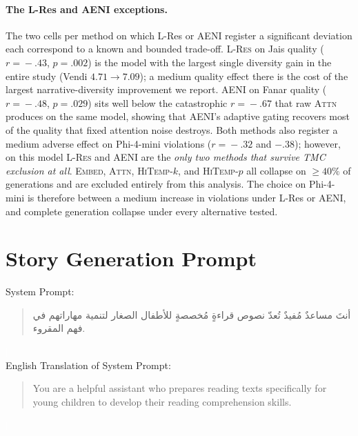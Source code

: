 \documentclass[11pt]{article}
\begin{document}
\paragraph{The L-Res and AENI exceptions.} The two cells per method on which L-Res or AENI register a significant deviation each correspond to a known and bounded trade-off. \textsc{L-Res} on Jais quality ($r\!=\!-.43$, $p\!=\!.002$) is the model with the largest single diversity gain in the entire study (Vendi $4.71 \to 7.09$); a medium quality effect there is the cost of the largest narrative-diversity improvement we report. \textsc{AENI} on Fanar quality ($r\!=\!-.48$, $p\!=\!.029$) sits well below the catastrophic $r\!=\!-.67$ that raw \textsc{Attn} produces on the same model, showing that AENI's adaptive gating recovers most of the quality that fixed attention noise destroys. Both methods also register a medium adverse effect on Phi-4-mini violations ($r\!=\!-.32$ and $-.38$); however, on this model \textsc{L-Res} and \textsc{AENI} are the \emph{only two methods that survive TMC exclusion at all}. \textsc{Embed}, \textsc{Attn}, \textsc{HiTemp-$k$}, and \textsc{HiTemp-$p$} all collapse on $\geq 40\%$ of generations and are excluded entirely from this analysis. The choice on Phi-4-mini is therefore between a medium increase in violations under L-Res or AENI, and complete generation collapse under every alternative tested.

\section{Story Generation Prompt}

System Prompt:
\begin{quote}
\begin{Arabic}
أنتَ مساعدٌ مُفيدٌ تُعدّ نصوص قراءةٍ مُخصصةٍ للأطفال الصغار لتنمية مهاراتهم في فهم المقروء.
\end{Arabic}
\end{quote}

\textcolor{white}{|}\\

English Translation of System Prompt:
\begin{quote}
You are a helpful assistant who prepares reading texts specifically for young children to develop their reading comprehension skills.
\end{quote}

\textcolor{white}{|}\\
\end{document}
